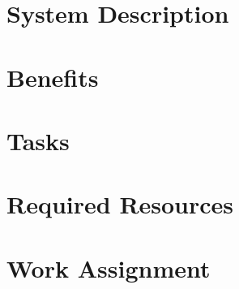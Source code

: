 \section{System Description}


\section{Benefits}


\section{Tasks}


\section{Required Resources}


\section{Work Assignment}
